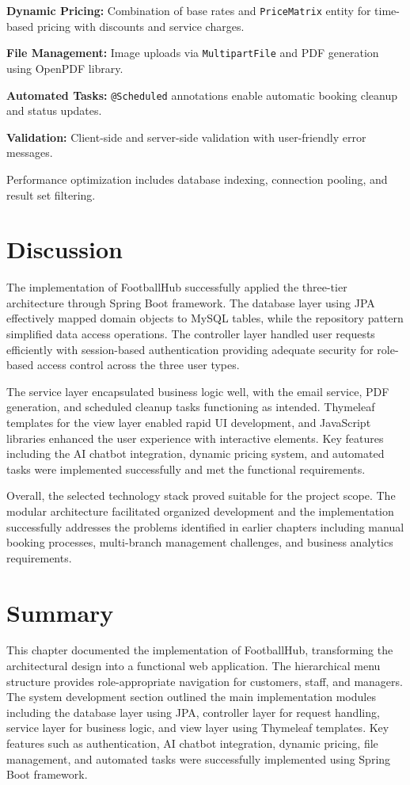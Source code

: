 \textbf{Dynamic Pricing:} Combination of base rates and \texttt{PriceMatrix} entity for time-based pricing with discounts and service charges.

\textbf{File Management:} Image uploads via \texttt{MultipartFile} and PDF generation using OpenPDF library.

\textbf{Automated Tasks:} \texttt{@Scheduled} annotations enable automatic booking cleanup and status updates.

\textbf{Validation:} Client-side and server-side validation with user-friendly error messages.

Performance optimization includes database indexing, connection pooling, and result set filtering.

\section{Discussion}

The implementation of FootballHub successfully applied the three-tier architecture through Spring Boot framework. The database layer using JPA effectively mapped domain objects to MySQL tables, while the repository pattern simplified data access operations. The controller layer handled user requests efficiently with session-based authentication providing adequate security for role-based access control across the three user types.

The service layer encapsulated business logic well, with the email service, PDF generation, and scheduled cleanup tasks functioning as intended. Thymeleaf templates for the view layer enabled rapid UI development, and JavaScript libraries enhanced the user experience with interactive elements. Key features including the AI chatbot integration, dynamic pricing system, and automated tasks were implemented successfully and met the functional requirements.

Overall, the selected technology stack proved suitable for the project scope. The modular architecture facilitated organized development and the implementation successfully addresses the problems identified in earlier chapters including manual booking processes, multi-branch management challenges, and business analytics requirements.

\section{Summary}

This chapter documented the implementation of FootballHub, transforming the architectural design into a functional web application. The hierarchical menu structure provides role-appropriate navigation for customers, staff, and managers. The system development section outlined the main implementation modules including the database layer using JPA, controller layer for request handling, service layer for business logic, and view layer using Thymeleaf templates. Key features such as authentication, AI chatbot integration, dynamic pricing, file management, and automated tasks were successfully implemented using Spring Boot framework.

